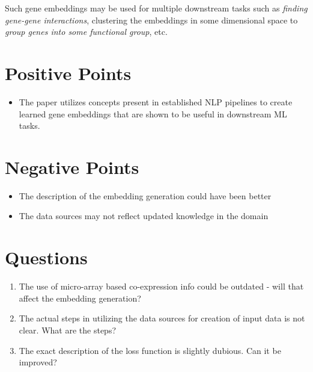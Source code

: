 \documentclass{article}
\begin{document}
\begin{sloppypar}
\begin{normalsize}
		Such gene embeddings may be used for multiple downstream tasks such as \textit{finding gene-gene interactions}, clustering the embeddings in some dimensional space to \textit{group genes into some functional group}, etc.
        
		
	   	
	   	\section{Positive Points}
	   	\begin{itemize}
	   	    \item The paper utilizes concepts present in established NLP pipelines to create learned gene embeddings that are shown to be useful in downstream ML tasks.
	   	\end{itemize}
	   	
	   	\section{Negative Points}
	   	\begin{itemize}
			\item The description of the embedding generation could have been better
			\item The data sources may not reflect updated knowledge in the domain
	   	\end{itemize}
	   	
	   	\section{Questions}
	   	\begin{enumerate}
	   	    \item The use of micro-array based co-expression info could be outdated - will that affect the embedding generation?
			\item The actual steps in utilizing the data sources for creation of input data is not clear. What are the steps?
			\item The exact description of the loss function is slightly dubious. Can it be improved?
	   	\end{enumerate}

    \end{normalsize}
    
    
    
  
\end{sloppypar}
\end{document}
